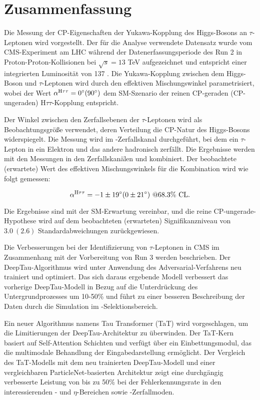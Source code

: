 \thispagestyle{empty}
\vspace{-3cm}
\section*{\centering Zusammenfassung}
\noindent

Die Messung der CP-Eigenschaften der Yukawa-Kopplung des Higgs-Bosons an $\tau$-Leptonen wird vorgestellt. Der f\"ur die Analyse verwendete Datensatz wurde vom CMS-Experiment am LHC w\"ahrend der Datenerfassungsperiode des Run 2 in Proton-Proton-Kollisionen bei $\sqrt{s}=13$ TeV aufgezeichnet und entspricht einer integrierten Luminosit\"at von 137 \ifb. Die Yukawa-Kopplung zwischen dem Higgs-Boson und $\tau$-Leptonen wird durch den effektiven Mischungswinkel \mixa parametrisiert, wobei der Wert $\alpha^{\text{H}\tau\tau} = 0^\circ (90^\circ)$ dem SM-Szenario der reinen CP-geraden (CP-ungeraden) $\text{H}\tau\tau$-Kopplung entspricht. 

Der Winkel zwischen den Zerfallsebenen der $\tau$-Leptonen wird als Beobachtungsgr\"o{\ss}e verwendet, deren Verteilung die CP-Natur des Higgs-Bosons widerspiegelt. Die Messung wird im \et-Zerfallskanal durchgef\"uhrt, bei dem ein $\tau$-Lepton in ein Elektron und das andere hadronisch zerf\"allt. Die Ergebnisse werden mit den Messungen in den Zerfallskan\"alen \mt und \tata kombiniert. Der beobachtete (erwartete) Wert des effektiven Mischungswinkels f\"ur die Kombination wird wie folgt gemessen:

\begin{equation}
    \alpha^{\text{H}\tau\tau} = -1 \pm 19^\circ (0 \pm 21^\circ) ~@68.3\% \text{ CL}.
\end{equation}

Die Ergebnisse sind mit der SM-Erwartung vereinbar, und die reine CP-ungerade-Hypothese wird auf dem beobachteten (erwarteten) Signifikanzniveau von $3.0 ~(2.6)$ Standardabweichungen zur\"uckgewiesen.

Die Verbesserungen bei der Identifizierung von $\tau$-Leptonen in CMS im Zusammenhang mit der Vorbereitung von Run 3 werden beschrieben. Der DeepTau-Algorithmus wird unter Anwendung des Adversarial-Verfahrens neu trainiert und optimiert. Das sich daraus ergebende Modell verbessert das vorherige DeepTau-Modell in Bezug auf die Unterdr\"uckung des Untergrundprozesses um 10-50\% und f\"uhrt zu einer besseren Beschreibung der Daten durch die Simulation im \htt-Selektionsbereich. 

Ein neuer Algorithmus namens Tau Transformer (TaT) wird vorgeschlagen, um die Limitierungen der DeepTau-Architektur zu \"uberwinden. Der TaT-Kern basiert auf Self-Attention Schichten und verf\"ugt \"uber ein Einbettungsmodul, das die multimodale Behandlung der Eingabedarstellung erm\"oglicht. Der Vergleich des TaT-Modells mit dem neu trainierten DeepTau-Modell und einer vergleichbaren ParticleNet-basierten Architektur zeigt eine durchg\"angig verbesserte Leistung von bis zu 50\% bei der Fehlerkennungsrate in den interessierenden \pt- und $\eta$-Bereichen sowie \tauh-Zerfallmoden.   

